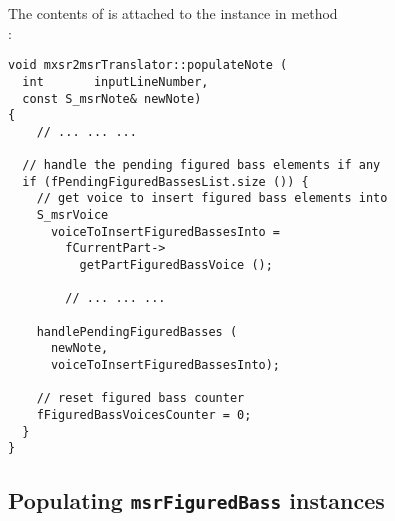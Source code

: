 The contents of  is attached to the  instance in method\\
:
\begin{lstlisting}[language=CPlusPlus]
void mxsr2msrTranslator::populateNote (
  int       inputLineNumber,
  const S_msrNote& newNote)
{
	// ... ... ...

  // handle the pending figured bass elements if any
  if (fPendingFiguredBassesList.size ()) {
    // get voice to insert figured bass elements into
    S_msrVoice
      voiceToInsertFiguredBassesInto =
        fCurrentPart->
          getPartFiguredBassVoice ();

		// ... ... ...

    handlePendingFiguredBasses (
      newNote,
      voiceToInsertFiguredBassesInto);

    // reset figured bass counter
    fFiguredBassVoicesCounter = 0;
  }
}
\end{lstlisting}


\subsection{Populating {\tt msrFiguredBass} instances}

